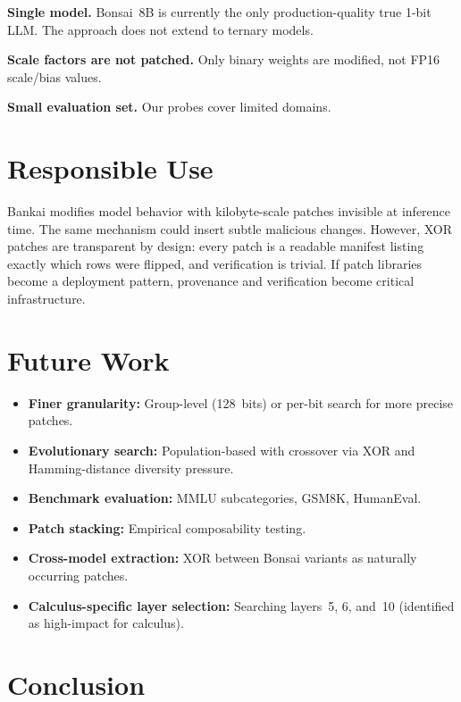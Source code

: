\documentclass[11pt,a4paper]{article}
\begin{document}
\textbf{Single model.} Bonsai~8B is currently the only production-quality
true 1-bit LLM. The approach does not extend to ternary models.

\textbf{Scale factors are not patched.} Only binary weights are modified,
not FP16 scale/bias values.

\textbf{Small evaluation set.} Our probes cover limited domains.

\section{Responsible Use}

Bankai modifies model behavior with kilobyte-scale patches invisible at
inference time. The same mechanism could insert subtle malicious changes.
However, XOR patches are transparent by design: every patch is a readable
manifest listing exactly which rows were flipped, and verification is
trivial. If patch libraries become a deployment pattern, provenance and
verification become critical infrastructure.

\section{Future Work}

\begin{itemize}[nosep]
  \item \textbf{Finer granularity:} Group-level (128~bits) or per-bit
    search for more precise patches.
  \item \textbf{Evolutionary search:} Population-based with crossover
    via XOR and Hamming-distance diversity pressure.
  \item \textbf{Benchmark evaluation:} MMLU subcategories, GSM8K,
    HumanEval.
  \item \textbf{Patch stacking:} Empirical composability testing.
  \item \textbf{Cross-model extraction:} XOR between Bonsai variants
    as naturally occurring patches.
  \item \textbf{Calculus-specific layer selection:} Searching layers~5,
    6, and~10 (identified as high-impact for calculus).
\end{itemize}

\section{Conclusion}
\end{document}
